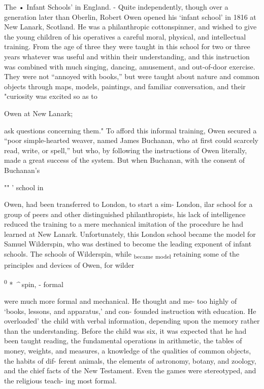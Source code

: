 \documentclass[]{book}
\begin{document}
The • Infant Schools' in England. - Quite independently, though over a generation later than Oberlin, Robert Owen opened his `infant school' in 1816 at New Lanark, Scotland. He was a philanthropic cottonspinner, and wished to give the young children of his operatives a careful moral, physical, and intellectual training. From the age of three they were taught in this school for two or three years whatever was useful and within their understanding, and this instruction was combined with much singing, dancing, amusement, and out-of-door exercise. They were not ``annoyed with books,'' but were taught about nature and common objects through maps, models, paintings, and familiar conversation, and their "curiosity was excited so as to

Owen at New Lanark;

ask questions concerning them." To afford this informal training, Owen secured a ``poor simple-hearted weaver, named James Buchanan, who at first could scarcely read, write, or spell,'' but who, by following the instructions of Owen literally, made a great success of the system. But when Buchanan, with the consent of Buchanan's

"" ' school in

Owen, had been transferred to London, to start a sim- London, ilar school for a group of peers and other distinguished philanthropists, his lack of intelligence reduced the training to a mere mechanical imitation of the procedure he had learned at New Lanark. Unfortunately, this London school became the model for Samuel Wilderspin, who was destined to become the leading exponent of infant schools. The schools of Wilderspin, while \textsubscript{became} \textsubscript{model} retaining some of the principles and devices of Owen, for wilder

\textsuperscript{0} * \emph{\^{}} spin, - formal

were much more formal and mechanical. He thought and me- too highly of `books, lessons, and apparatus,' and con- founded instruction with education. He overloaded' the child with verbal information, depending upon the memory rather than the understanding. Before the child was six, it was expected that he had been taught reading, the fundamental operations in arithmetic, the tables of money, weights, and measures, a knowledge of the qualities of common objects, the habits of dif- ferent animals, the elements of astronomy, botany, and zoology, and the chief facts of the New Testament. Even the games were stereotyped, and the religious teach- ing most formal.
\end{document}
